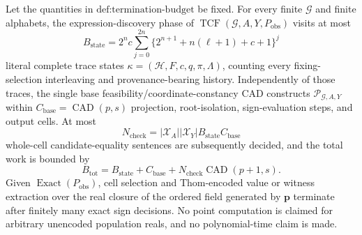 Let the quantities in \(\text{def:termination-budget}\) be fixed. For every finite \(\mathcal G\) and finite alphabets, the expression-discovery phase of \(\operatorname{TCF}(\mathcal G,A,Y,P_{\mathrm{obs}})\) visits at most
\[
B_{\mathrm{state}}=2^n c\sum_{j=0}^{2n}\bigl\{2^{n+1}+n(\ell+1)+c+1\bigr\}^j
\]
literal complete trace states \(\kappa=(\mathcal H,F,c,q,\pi,\Lambda)\), counting every fixing-selection interleaving and provenance-bearing history. Independently of those traces, the single base feasibility/coordinate-constancy CAD constructs \(\mathscr P_{\mathcal G,A,Y}\) within \(C_{\mathrm{base}}=\operatorname{CAD}(p,s)\) projection, root-isolation, sign-evaluation steps, and output cells. At most
\[
N_{\mathrm{check}}=|\mathcal X_A||\mathcal X_Y|B_{\mathrm{state}}C_{\mathrm{base}}
\]
whole-cell candidate-equality sentences are subsequently decided, and the total work is bounded by
\[
B_{\mathrm{tot}}=
B_{\mathrm{state}}+C_{\mathrm{base}}
+N_{\mathrm{check}}\operatorname{CAD}(p+1,s).
\]
Given \(\operatorname{Exact}(P_{\mathrm{obs}})\), cell selection and Thom-encoded value or witness extraction over the real closure of the ordered field generated by \(\mathbf p\) terminate after finitely many exact sign decisions. No point computation is claimed for arbitrary unencoded population reals, and no polynomial-time claim is made.